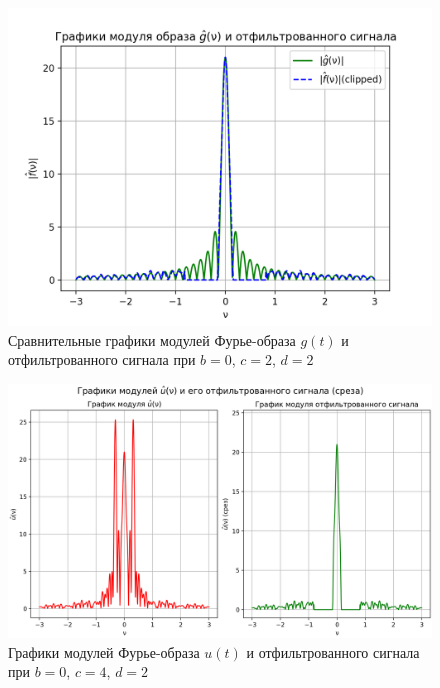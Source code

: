 \begin{figure}[ht!]
    \centering
    \includegraphics[scale=0.55]{media/1 task/specific_freq/Fourier_Image_Comparison_0_2_2_-0,805:-0,156.png}
    \caption{Сравнительные графики модулей Фурье-образа $g(t)$ и отфильтрованного сигнала при $b=0$,  $c=2$,  $d=2$}
    \label{fig:fourc_0_2_2}
\end{figure}

\begin{figure}[ht!]
    \centering
    \includegraphics[scale=0.55]{media/1 task/specific_freq/Fourier_Image_0_4_2_-0,805:-0,156.png}
    \caption{Графики модулей Фурье-образа $u(t)$ и отфильтрованного сигнала при $b=0$,  $c=4$,  $d=2$}
    \label{fig:four_0_4_2}
\end{figure}

